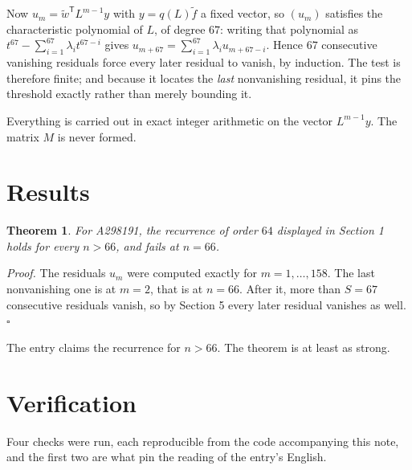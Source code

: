 \documentclass[11pt]{article}
\newtheorem{theorem}{Theorem}
\theoremstyle{definition}
\begin{document}
Now $u_m = \tilde w^{\mathsf T} L^{m-1} y$ with $y = q(L)\tilde f$ a fixed vector, so $(u_m)$ satisfies the characteristic polynomial of $L$, of degree $67$: writing that polynomial as $t^{67} - \sum_{i=1}^{67} \lambda_i t^{67-i}$ gives $u_{m+67} = \sum_{i=1}^{67} \lambda_i u_{m+67-i}$. Hence $67$ consecutive vanishing residuals force every later residual to vanish, by induction. The test is therefore finite; and because it locates the {\itshape last} nonvanishing residual, it pins the threshold exactly rather than merely bounding it.

Everything is carried out in exact integer arithmetic on the vector $L^{m-1}y$. The matrix $M$ is never formed.

\section{Results}

\begin{theorem} For A298191, the recurrence of order $64$ displayed in Section 1 holds for every $n > 66$, and fails at $n = 66$.\end{theorem}

{\itshape Proof.} The residuals $u_m$ were computed exactly for $m = 1,\dots,158$. The last nonvanishing one is at $m = 2$, that is at $n = 66$. After it, more than $S = 67$ consecutive residuals vanish, so by Section 5 every later residual vanishes as well. $\square$

The entry claims the recurrence for $n > 66$. The theorem is at least as strong.

\section{Verification}

Four checks were run, each reproducible from the code accompanying this note, and the first two are what pin the reading of the entry's English.
\end{document}
